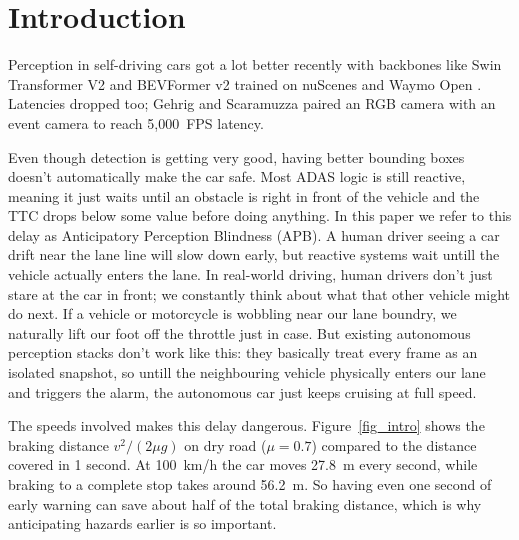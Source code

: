 \documentclass[preprint,12pt]{elsarticle}
\begin{document}
\linenumbers

\section{Introduction}
Perception in self-driving cars got a lot better recently with backbones like Swin Transformer V2 \cite{liu2022swin} and BEVFormer v2 \cite{yang2023bevformer} trained on nuScenes \cite{caesar2020nuscenes} and Waymo Open \cite{sun2020waymo}. Latencies dropped too; Gehrig and Scaramuzza \cite{gehrig2024low} paired an RGB camera with an event camera to reach 5,000~FPS latency.

Even though detection is getting very good, having better bounding boxes doesn't automatically make the car safe. Most ADAS logic is still reactive, meaning it just waits until an obstacle is right in front of the vehicle and the TTC drops below some value before doing anything. In this paper we refer to this delay as Anticipatory Perception Blindness (APB). A human driver seeing a car drift near the lane line will slow down early, but reactive systems wait untill the vehicle actually enters the lane. In real-world driving, human drivers don't just stare at the car in front; we constantly think about what that other vehicle might do next. If a vehicle or motorcycle is wobbling near our lane boundry, we naturally lift our foot off the throttle just in case. But existing autonomous perception stacks don't work like this: they basically treat every frame as an isolated snapshot, so untill the neighbouring vehicle physically enters our lane and triggers the alarm, the autonomous car just keeps cruising at full speed.

The speeds involved makes this delay dangerous. Figure~\ref{fig_intro} shows the braking distance $v^2/(2\mu g)$ on dry road ($\mu = 0.7$) compared to the distance covered in 1 second. At 100~km/h the car moves 27.8~m every second, while braking to a complete stop takes around 56.2~m. So having even one second of early warning can save about half of the total braking distance, which is why anticipating hazards earlier is so important.
\end{document}
